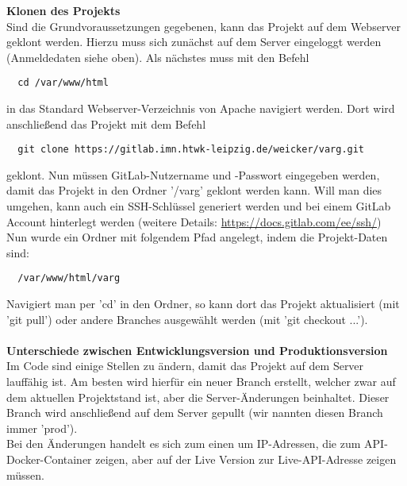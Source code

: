 \documentclass[twoside]{report}
\begin{document}
\textbf{Klonen des Projekts}
\\Sind die Grundvoraussetzungen gegebenen, kann das Projekt auf dem Webserver geklont werden.
Hierzu muss sich zunächst auf dem Server eingeloggt werden (Anmeldedaten siehe oben). Als nächstes muss mit den Befehl
\begin{verbatim}
  cd /var/www/html
\end{verbatim} 
in das Standard Webserver-Verzeichnis von Apache navigiert werden. Dort wird anschließend das Projekt mit dem Befehl
\begin{verbatim}
  git clone https://gitlab.imn.htwk-leipzig.de/weicker/varg.git
\end{verbatim} 
geklont. Nun müssen GitLab-Nutzername und -Passwort eingegeben werden, damit das Projekt in den Ordner '/varg' geklont werden kann.
Will man dies umgehen, kann auch ein SSH-Schlüssel generiert werden und bei einem GitLab Account hinterlegt werden (weitere Details:
\url{https://docs.gitlab.com/ee/ssh/})
\\Nun wurde ein Ordner mit folgendem Pfad angelegt, indem die Projekt-Daten sind:
\begin{verbatim}
  /var/www/html/varg
\end{verbatim}
Navigiert man per 'cd' in den Ordner, so kann dort das Projekt aktualisiert (mit 'git pull') oder andere Branches ausgewählt werden (mit 'git checkout ...').
\\\\
\textbf{Unterschiede zwischen Entwicklungsversion und Produktionsversion}
\\Im Code sind einige Stellen zu ändern, damit das Projekt auf dem Server lauffähig ist. Am besten wird hierfür ein neuer Branch erstellt, welcher zwar auf dem 
aktuellen Projektstand ist, aber die Server-Änderungen beinhaltet. Dieser Branch wird anschließend auf dem Server gepullt (wir nannten diesen Branch immer 'prod').
\\Bei den Änderungen handelt es sich zum einen um IP-Adressen, die zum API-Docker-Container zeigen, aber auf der Live Version zur Live-API-Adresse zeigen müssen. 
\end{document}
